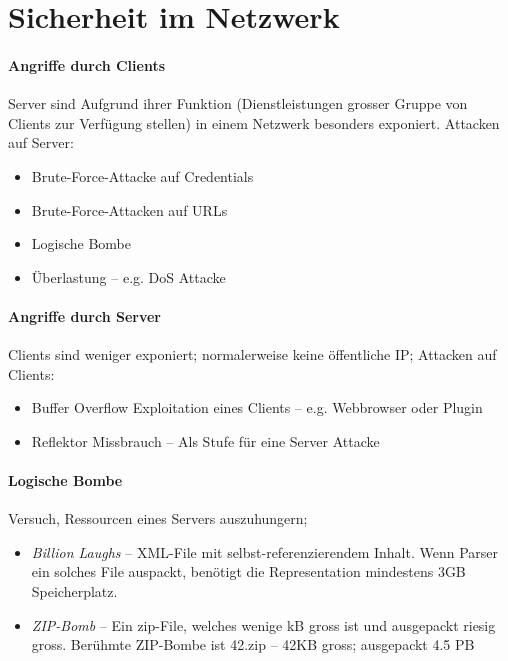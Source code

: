 \documentclass[a4paper,12pt]{article}
\begin{document}
\newpage
\section{Sicherheit im Netzwerk}

\paragraph{Angriffe durch Clients}
Server sind Aufgrund ihrer Funktion (Dienstleistungen grosser Gruppe von Clients zur Verfügung stellen) in einem Netzwerk besonders exponiert. Attacken auf Server:

\begin{itemize}
\item Brute-Force-Attacke auf Credentials
\item Brute-Force-Attacken auf URLs
\item Logische Bombe
\item Überlastung -- e.g. DoS Attacke
\end{itemize}


\paragraph{Angriffe durch Server}
Clients sind weniger exponiert; normalerweise keine öffentliche IP; Attacken auf Clients: 

\begin{itemize}
\item Buffer Overflow Exploitation eines Clients -- e.g. Webbrowser oder Plugin
\item Reflektor Missbrauch -- Als Stufe für eine Server Attacke
\end{itemize}


\paragraph{Logische Bombe}
Versuch, Ressourcen eines Servers auszuhungern; 

\begin{itemize}
\item \emph{Billion Laughs} -- XML-File mit selbst-referenzierendem Inhalt. Wenn Parser ein solches File auspackt, benötigt die Representation mindestens 3GB Speicherplatz.
\item \emph{ZIP-Bomb} -- Ein zip-File, welches wenige kB gross ist und ausgepackt riesig gross. Berühmte ZIP-Bombe ist 42.zip -- 42KB gross; ausgepackt 4.5 PB
\end{itemize}
\end{document}
